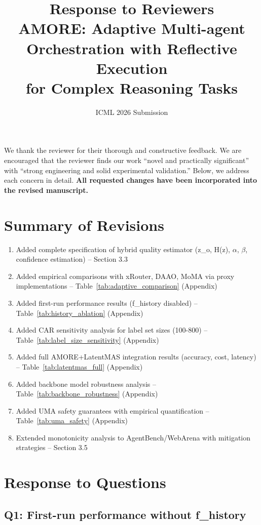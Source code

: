 \documentclass[11pt]{article}
\title{Response to Reviewers\\
\large AMORE: Adaptive Multi-agent Orchestration with Reflective Execution\\for Complex Reasoning Tasks}
\author{ICML 2026 Submission}
\date{}
\begin{document}
\maketitle

We thank the reviewer for their thorough and constructive feedback. We are encouraged that the reviewer finds our work ``novel and practically significant'' with ``strong engineering and solid experimental validation.'' Below, we address each concern in detail. \textbf{All requested changes have been incorporated into the revised manuscript.}

\section*{Summary of Revisions}

\begin{enumerate}[leftmargin=*]
    \item Added complete specification of hybrid quality estimator (z\_o, H(z), $\alpha$, $\beta$, confidence estimation) -- Section 3.3
    \item Added empirical comparisons with xRouter, DAAO, MoMA via proxy implementations -- Table~\ref{tab:adaptive_comparison} (Appendix)
    \item Added first-run performance results (f\_history disabled) -- Table~\ref{tab:history_ablation} (Appendix)
    \item Added CAR sensitivity analysis for label set sizes (100-800) -- Table~\ref{tab:label_size_sensitivity} (Appendix)
    \item Added full AMORE+LatentMAS integration results (accuracy, cost, latency) -- Table~\ref{tab:latentmas_full} (Appendix)
    \item Added backbone model robustness analysis -- Table~\ref{tab:backbone_robustness} (Appendix)
    \item Added UMA safety guarantees with empirical quantification -- Table~\ref{tab:uma_safety} (Appendix)
    \item Extended monotonicity analysis to AgentBench/WebArena with mitigation strategies -- Section 3.5
\end{enumerate}

\section*{Response to Questions}

\subsection*{Q1: First-run performance without f\_history}
\end{document}
